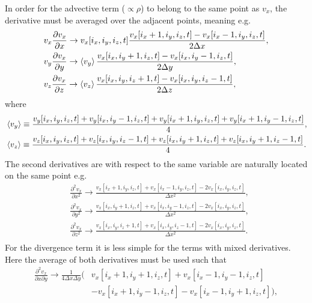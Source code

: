 In order for the advective term ($\propto \rho$) to belong to the same point as $v_x$, the derivative must be averaged over the adjacent points, meaning e.g.
\begin{equation}
	\begin{split}
		&v_x\frac{\partial v_x}{\partial x} \rightarrow  v_x[i_x,i_y,i_z,t]\frac{v_x[i_x+1,i_y,i_z,t]-v_x[i_x-1,i_y,i_z,t]}{2\Delta x},\\
		&v_y\frac{\partial v_x}{\partial y}\rightarrow  \braket{v_y}\frac{v_x[i_x,i_y+1,i_z,t]-v_x[i_x,i_y-1,i_z,t]}{2\Delta y},\\
		&v_z\frac{\partial v_x}{\partial z}\rightarrow  \braket{v_z}\frac{v_x[i_x,i_y,i_z+1,t]-v_x[i_x,i_y,i_z-1,t]}{2\Delta z},\\
	\end{split}
\end{equation}
where
\begin{equation}
	\begin{split}
		&\braket{v_y}\equiv \frac{v_y[i_x,i_y,i_z,t]+v_y[i_x,i_y-1,i_z,t]+v_y[i_x+1,i_y,i_z,t]+v_y[i_x+1,i_y-1,i_z,t]}{4},\\
		&\braket{v_z}\equiv \frac{v_z[i_x,i_y,i_z,t]+v_z[i_x,i_y,i_z-1,t]+v_z[i_x,i_y+1,i_z,t]+v_z[i_x,i_y+1,i_z-1,t]}{4}.\\
	\end{split}
\end{equation}
The second derivatives are with respect to the same variable are naturally located on the same point e.g.
\begin{equation}
	\begin{split}
		&\frac{\partial^2 v_x}{\partial x^2} \rightarrow  \frac{v_x[i_x+1,i_y,i_z,t]+v_x[i_x-1,i_y,i_z,t]-2v_x[i_x,i_y,i_z,t]}{\Delta x^2},\\
		&\frac{\partial^2 v_x}{\partial y^2}\rightarrow   \frac{v_x[i_x,i_y+1,i_z,t]+v_x[i_x,i_y-1,i_z,t]-2v_x[i_x,i_y,i_z,t]}{\Delta x^2},\\
		&\frac{\partial^2 v_x}{\partial z^2}\rightarrow  \frac{v_x[i_x,i_y,i_z+1,t]+v_x[i_x,i_y,i_z-1,t]-2v_x[i_x,i_y,i_z,t]}{\Delta x^2}.\\
	\end{split}
\end{equation}
For the divergence term it is less simple for the terms with mixed derivatives. Here the average of both derivatives must be used such that
\begin{equation}
	\begin{split}
		\frac{\partial^2 v_x}{\partial x\partial y} \rightarrow \frac{1}{4\Delta x \Delta y}\bigg(&v_x[i_x+1,i_y+1,i_z,t]+v_x[i_x-1,i_y-1,i_z,t]\\
		&-v_x[i_x+1,i_y-1,i_z,t]-v_x[i_x-1,i_y+1,i_z,t]\bigg),\\
	\end{split}
\end{equation}                           
